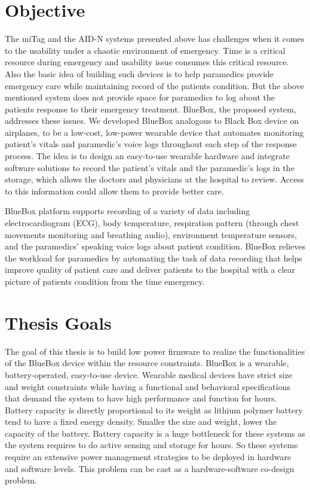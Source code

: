 \section{Objective}

The miTag and the AID-N systems presented above has challenges when
it comes to the usability under a chaotic environment of emergency.
Time is a critical resource during emergency and usability issue
consumes this critical resource. Also the basic idea of building such
devices is to help paramedics provide emergency care while
maintaining record of the patients condition. But the above mentioned
system does not provide space for paramedics to log about the
patients response to their emergency treatment. BlueBox, the proposed
system, addresses these issues.  We developed BlueBox analogous to
Black Box device on airplanes, to be a low-cost, low-power wearable
device that automates monitoring patient's vitals and paramedic's
voice logs throughout each step of the response process. The idea is
to design an easy-to-use wearable hardware and integrate software
solutions to record the patient's vitals and the paramedic's logs in
the storage, which allows the doctors and physicians at the hospital
to review. Access to this information could allow them to provide
better care.

BlueBox platform supports recording of a variety of data including
electrocardiogram (ECG), body temperature, respiration pattern
(through chest movements monitoring and breathing audio), environment
temperature sensors, and the paramedics' speaking voice logs about
patient condition.  BlueBox relieves the workload for paramedics by
automating the task of data recording that helps improve quality of
patient care and deliver patients to the hospital with a clear
picture of patients condition from the time emergency. 

\section{Thesis Goals}

The goal of this thesis is to build low power firmware to realize the
functionalities of the BlueBox device within the resource
constraints. BlueBox is a wearable, battery-operated, easy-to-use
device. Wearable medical devices have strict size and weight
constraints while having a functional and behavioral specifications
that demand the system to have high performance and function for
hours. Battery capacity is directly proportional to its weight as
lithium polymer battery tend to have a fixed energy density. Smaller
the size and weight, lower the capacity of the battery. Battery
capacity is a huge bottleneck for these systems as the system
requires to do active sensing and storage for hours. So these systems
require an extensive power management strategies to be deployed in
hardware and software levels. This problem can be cast as a
hardware-software co-design problem.


